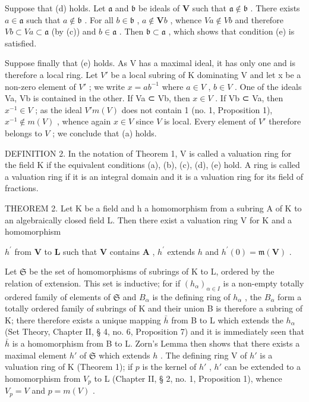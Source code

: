 Suppose that (d) holds. Let \(\mathfrak{a}\) and \(\mathfrak{b}\) be ideals of \(\mathbf{V}\) such that \(\mathfrak{a} \notin \mathfrak{b}\) . There exists \(a \in \mathfrak{a}\) such that \(a \notin \mathfrak{b}\) . For all \(b \in \mathfrak{b}\) , \(a \notin \mathbf{V}b\) , whence \(Va \notin Vb\) and therefore \(Vb \subset Va \subset \mathfrak{a}\) (by (c)) and \(b \in \mathfrak{a}\) . Then \(\mathfrak{b} \subset \mathfrak{a}\) , which shows that condition (e) is satisfied.

Suppose finally that (e) holds. As V has a maximal ideal, it has only one and is therefore a local ring. Let \(V'\) be a local subring of K dominating V and let x be a non-zero element of \(V'\) ; we write \(x = ab^{-1}\) where \(a \in V\) , \(b \in V\) . One of the ideals Va, Vb is contained in the other. If Va ⊂ Vb, then \(x \in V\) . If Vb ⊂ Va, then \(x^{-1} \in V\) ; as the ideal \(V'm(V)\) does not contain 1 (no. 1, Proposition 1), \(x^{-1} \notin m(V)\) , whence again \(x \in V\) since \(V\) is local. Every element of \(V'\) therefore belongs to \(V\) ; we conclude that (a) holds.

DEFINITION 2. In the notation of Theorem 1, V is called a valuation ring for the field K if the equivalent conditions (a), (b), (c), (d), (e) hold. A ring is called a valuation ring if it is an integral domain and it is a valuation ring for its field of fractions.

THEOREM 2. Let K be a field and h a homomorphism from a subring A of K to an algebraically closed field L. Then there exist a valuation ring V for K and a homomorphism

\(h^{\prime}\) from \(\mathbf{V}\) to \(\mathbf{L}\) such that \(\mathbf{V}\) contains \(\mathbf{A}\) , \(h^{\prime}\) extends \(h\) and \(h^{\prime}(0) = \mathfrak{m}(\mathbf{V})\) .

Let \(\mathfrak{S}\) be the set of homomorphisms of subrings of K to L, ordered by the relation of extension. This set is inductive; for if \((h_{\alpha})_{\alpha \in I}\) is a non-empty totally ordered family of elements of \(\mathfrak{S}\) and \(B_{\alpha}\) is the defining ring of \(h_{\alpha}\) , the \(B_{\alpha}\) form a totally ordered family of subrings of K and their union B is therefore a subring of K; there therefore exists a unique mapping \(\bar{h}\) from B to L which extends the \(h_{\alpha}\) (Set Theory, Chapter II, § 4, no. 6, Proposition 7) and it is immediately seen that \(\bar{h}\) is a homomorphism from B to L. Zorn's Lemma then shows that there exists a maximal element \(h'\) of \(\mathfrak{S}\) which extends \(h\) . The defining ring V of \(h'\) is a valuation ring of K (Theorem 1); if \(p\) is the kernel of \(h'\) , \(h'\) can be extended to a homomorphism from \(V_p\) to L (Chapter II, § 2, no. 1, Proposition 1), whence \(V_p = V\) and \(p = m(V)\) .

